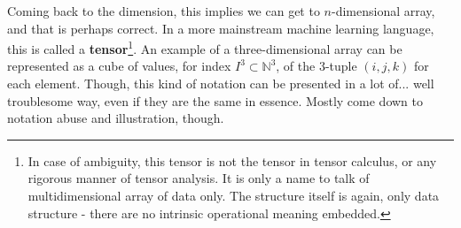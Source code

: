 Coming back to the dimension, this implies we can get to $n$-dimensional array, and that is perhaps correct. In a more mainstream machine learning language, this is called a \textbf{tensor}\footnote{In case of ambiguity, this tensor is not the tensor in tensor calculus, or any rigorous manner of tensor analysis. It is only a name to talk of multidimensional array of data only. The structure itself is again, only data structure - there are no intrinsic operational meaning embedded.}. An example of a three-dimensional array can be represented as a cube of values, for index $I^{3}\subset \mathbb{N}^{3}$, of the 3-tuple $(i,j,k)$ for each element. Though, this kind of notation can be presented in a lot of... well troublesome way, even if they are the same in essence. Mostly come down to notation abuse and illustration, though. 
\begin{center}
\end{center}
